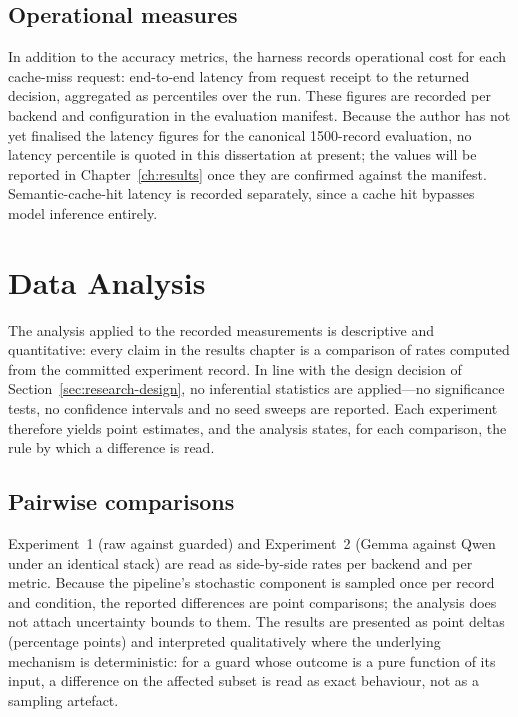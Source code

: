 \subsection*{Operational measures}

In addition to the accuracy metrics, the harness records operational cost for
each cache-miss request: end-to-end latency from request receipt to the returned
decision, aggregated as percentiles over the run. These figures are recorded per
backend and configuration in the evaluation manifest. Because the author has not
yet finalised the latency figures for the canonical 1500-record evaluation, no
latency percentile is quoted in this dissertation at present; the values will be
reported in Chapter~\ref{ch:results} once they are confirmed against the
manifest. Semantic-cache-hit latency is recorded separately, since a cache hit
bypasses model inference entirely.


\section{Data Analysis}\label{sec:data-analysis}

The analysis applied to the recorded measurements is descriptive and
quantitative: every claim in the results chapter is a comparison of rates
computed from the committed experiment record. In line with the design decision
of Section~\ref{sec:research-design}, no inferential statistics are applied---no
significance tests, no confidence intervals and no seed sweeps are reported.
Each experiment therefore yields point estimates, and the analysis states,
for each comparison, the rule by which a difference is read.

\subsection*{Pairwise comparisons}

Experiment~1 (raw against guarded) and Experiment~2 (Gemma against Qwen under an
identical stack) are read as side-by-side rates per backend and per metric.
Because the pipeline's stochastic component is sampled once per record and
condition, the reported differences are point comparisons; the analysis does not
attach uncertainty bounds to them. The results are presented as point deltas
(percentage points) and interpreted qualitatively where the underlying
mechanism is deterministic: for a guard whose outcome is a pure function of its
input, a difference on the affected subset is read as exact behaviour, not as a
sampling artefact.

